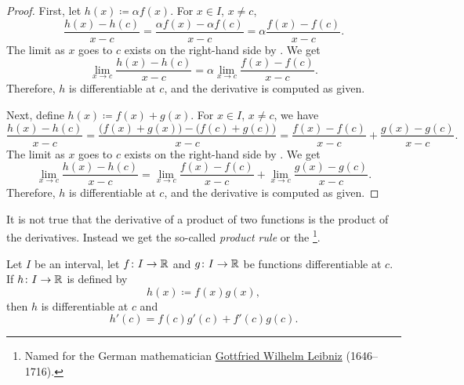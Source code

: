 \begin{proof}
First, let $h(x) \coloneqq \alpha f(x)$.
For $x \in I$, $x \not= c$,
\begin{equation*}
\frac{h(x)-h(c)}{x-c} =
\frac{\alpha f(x) - \alpha f(c)}{x-c}
=
\alpha \frac{f(x) - f(c)}{x-c} .
\end{equation*}
The limit as $x$ goes to $c$ exists on the right-hand side
by .  We get
\begin{equation*}
\lim_{x\to c}\frac{h(x)-h(c)}{x-c} =
\alpha \lim_{x\to c} \frac{f(x) - f(c)}{x-c} .
\end{equation*}
Therefore, $h$ is differentiable at $c$,
and the derivative is computed as given.

Next, define $h(x) \coloneqq f(x)+g(x)$.
For $x \in I$, $x \not= c$, we have
\begin{equation*}
\frac{h(x)-h(c)}{x-c} =
\frac{\bigl(f(x) + g(x)\bigr) - \bigl(f(c) + g(c)\bigr)}{x-c}
=
\frac{f(x) - f(c)}{x-c}
+
\frac{g(x) - g(c)}{x-c} .
\end{equation*}
The limit as $x$ goes to $c$ exists on the right-hand side
by .  We get
\begin{equation*}
\lim_{x\to c}\frac{h(x)-h(c)}{x-c} =
\lim_{x\to c} \frac{f(x) - f(c)}{x-c}
+
\lim_{x\to c}\frac{g(x) - g(c)}{x-c} .
\end{equation*}
Therefore, $h$ is differentiable at $c$,
and the derivative is computed as given.
\end{proof}

It is not true that the derivative of a product of two functions is
the product of the derivatives.  Instead we get the so-called \emph{product
rule} or the \emph{}%
\footnote{Named for the German mathematician
\href{https://en.wikipedia.org/wiki/Leibniz}{Gottfried Wilhelm Leibniz}
(1646--1716).}.

\begin{prop}
Let $I$ be an interval, let
$f \colon I \to {\mathbb{R}}$ and $g \colon I \to {\mathbb{R}}$ be 
functions differentiable at $c$.  If $h \colon I \to {\mathbb{R}}$
is defined by
\begin{equation*}
h(x) \coloneqq f(x) g(x) ,
\end{equation*}
then $h$ is differentiable at $c$ and
\begin{equation*}
h'(c) = f(c) g'(c) + f'(c) g(c) .
\end{equation*}
\end{prop}

